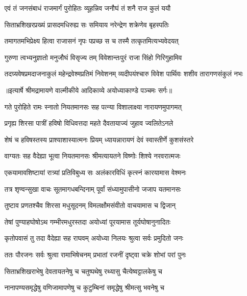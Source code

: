 \twolineshloka
{एवं तं जनसंबाधं राजमार्गं पुरोहितः}
{व्यूहन्निव जनौघं तं शनै राज कुलं ययौ} %

\twolineshloka
{सिताभ्रशिखरप्रख्यं प्रासदमधिरुह्य सः}
{समियाय नरेन्द्रेण शक्रेणेव बृहस्पतिः} %

\twolineshloka
{तमागतमभिप्रेक्ष्य हित्वा राजासनं नृपः}
{पप्रच्छ स च तस्मै तत्कृतमित्यभ्यवेदयत्} %

\twolineshloka
{गुरुणा त्वभ्यनुज्ञातो मनुजौघं विसृज्य तम्}
{विवेशान्तःपुरं राजा सिंहो गिरिगुहामिव} %

\fourlineindentedshloka
{तदग्र्यवेषप्रमदाजनाकुलं}
{ महेन्द्रवेश्मप्रतिमं निवेशनम्}
{व्यदीपयंश्चारु विवेश पार्थिवः}
{ शशीव तारागणसंकुलं नभः} %


{॥इत्यार्षे श्रीमद्रामायणे वाल्मीकीये आदिकाव्ये अयोध्याकाण्डे पञ्चमः सर्गः॥}


\twolineshloka
{गते पुरोहिते रामः स्नातो नियतमानसः}
{सह पत्न्या विशालाक्ष्या नारायणमुपागमत्} %

\twolineshloka
{प्रगृह्य शिरसा पात्रीं हविषो विधिवत्तदा}
{महते दैवतायाज्यं जुहाव ज्वलितेऽनले} %

\twolineshloka
{शेषं च हविषस्तस्य प्राश्याशास्यात्मनः प्रियम्}
{ध्यायन्नारायणं देवं स्वास्तीर्णे कुशसंस्तरे} %

\twolineshloka
{वाग्यतः सह वैदेह्या भूत्वा नियतमानसः}
{श्रीमत्यायतने विष्णोः शिश्ये नरवरात्मजः} %

\twolineshloka
{एकयामावशिष्टायां रात्र्यां प्रतिविबुध्य सः}
{अलंकारविधिं कृत्स्नं कारयामास वेश्मनः} %

\twolineshloka
{तत्र शृण्वन्सुखा वाचः सूतमागधबन्दिनाम्}
{पूर्वां संध्यामुपासीनो जजाप यतमानसः} %

\twolineshloka
{तुष्टाव प्रणतश्चैव शिरसा मधुसूदनम्}
{विमलक्षौमसंवीतो वाचयामास च द्विजान्} %

\twolineshloka
{तेषां पुण्याहघोषोऽथ गम्भीरमधुरस्तदा}
{अयोध्यां पूरयामास तूर्यघोषानुनादितः} %

\twolineshloka
{कृतोपवासं तु तदा वैदेह्या सह राघवम्}
{अयोध्या निलयः श्रुत्वा सर्वः प्रमुदितो जनः} %

\twolineshloka
{ततः पौरजनः सर्वः श्रुत्वा रामाभिषेचनम्}
{प्रभातां रजनीं दृष्ट्वा चक्रे शोभां परां पुनः} %

\twolineshloka
{सिताभ्रशिखराभेषु देवतायतनेषु च}
{चतुष्पथेषु रथ्यासु चैत्येष्वट्टालकेषु च} %

\twolineshloka
{नानापण्यसमृद्धेषु वणिजामापणेषु च}
{कुटुम्बिनां समृद्धेषु श्रीमत्सु भवनेषु च} %

